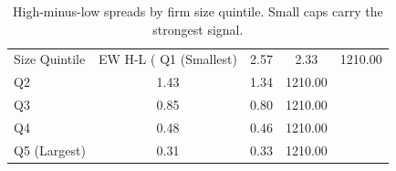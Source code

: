 \begin{table}[ht]
\centering
\caption{High-minus-low spreads by firm size quintile. Small caps carry the strongest signal.}
\label{tab:size_sorted}
\begin{tabular}{lccc}
\toprule
Size Quintile & EW H-L (%
\midrule
Q1 (Smallest) & 2.57 & 2.33 & 1210.00 \\
Q2 & 1.43 & 1.34 & 1210.00 \\
Q3 & 0.85 & 0.80 & 1210.00 \\
Q4 & 0.48 & 0.46 & 1210.00 \\
Q5 (Largest) & 0.31 & 0.33 & 1210.00 \\
\bottomrule
\end{tabular}
\end{table}
